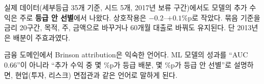 \begin{keybox}[결과 C7, C13, C17]
실제 데이터(세부등급 35개 기준, 시드 5개, 2017년 보류 구간)에서도 모델의 추가 수익은 주로 \textbf{등급 안 선별}에서 나왔다. 상호작용은 $-0.2$--$+0.1$\%p로 작았다. 묶음 기준을 금리 20구간, 목적, 주, 금액으로 바꾸거나 60개월 대출로 바꿔도 유지된다. 단 2013년은 배분이 주효과였다.
\end{keybox}

\begin{career}
금융 도메인에서 Brinson attribution은 익숙한 언어다. ML 모델의 성과를 ``AUC 0.66''이 아니라 ``추가 수익 중 몇 \%p가 등급 배분, 몇 \%p가 등급 안 선별''로 설명하면, 현업(투자, 리스크) 면접관과 같은 언어로 말하게 된다.
\end{career}
